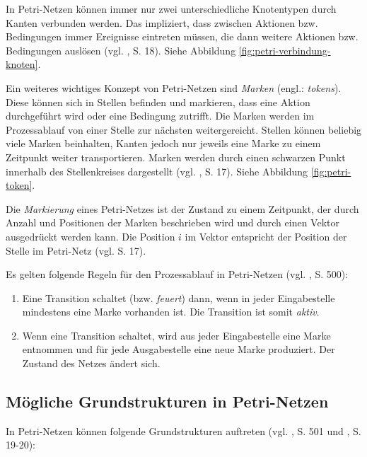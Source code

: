 In Petri-Netzen können immer nur zwei unterschiedliche Knotentypen durch Kanten verbunden werden. Das impliziert, dass zwischen Aktionen bzw. Bedingungen immer Ereignisse eintreten müssen, die dann weitere Aktionen bzw. Bedingungen auslösen (vgl. \citep{BernroiderStix2006}, S. 18). Siehe Abbildung \ref{fig:petri-verbindung-knoten}.


Ein weiteres wichtiges Konzept von Petri-Netzen sind \emph{Marken} (engl.: \emph{tokens}). Diese können sich in Stellen befinden und markieren, dass eine Aktion durchgeführt wird oder eine Bedingung zutrifft. Die Marken werden im Prozessablauf von einer Stelle zur nächsten weitergereicht. Stellen können beliebig viele Marken beinhalten, Kanten jedoch nur jeweils eine Marke zu einem Zeitpunkt weiter transportieren. Marken werden durch einen schwarzen Punkt innerhalb des Stellenkreises dargestellt (vgl. \citep{BernroiderStix2006}, S. 17). Siehe Abbildung \ref{fig:petri-token}.

Die \emph{Markierung} eines Petri-Netzes ist der Zustand zu einem Zeitpunkt, der durch Anzahl und Positionen der Marken beschrieben wird und durch einen Vektor ausgedrückt werden kann. Die Position $i$ im Vektor entspricht der Position der Stelle im Petri-Netz (vgl. \citep{BernroiderStix2006} S. 17).

Es gelten folgende Regeln für den Prozessablauf in Petri-Netzen (vgl. \citep{ClausSchwill2006}, S. 500):
\begin{enumerate}
\item Eine Transition schaltet (bzw. \emph{feuert}) dann, wenn in jeder Eingabestelle mindestens eine Marke vorhanden ist. Die Transition ist somit \emph{aktiv}.
\item Wenn eine Transition schaltet, wird aus jeder Eingabestelle eine Marke entnommen und für jede Ausgabestelle eine neue Marke produziert. Der Zustand des Netzes ändert sich.
\end{enumerate}

\subsection{Mögliche Grundstrukturen in Petri-Netzen}
In Petri-Netzen können folgende Grundstrukturen auftreten (vgl. \citep{ClausSchwill2006}, S. 501 und \citep{BernroiderStix2006}, S. 19-20):


